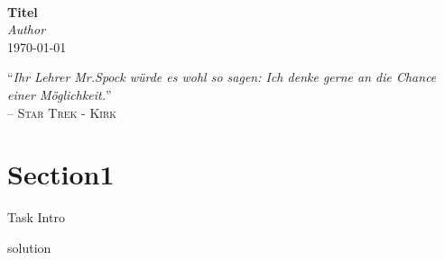 \documentclass[ngerman,a4paper,10pt]{scrartcl}
\newcommand{\DocTitle}      {Titel}
\newcommand{\DocAuthor}     {Author }
\newcommand{\DocDate}       {\today}
\begin{document}
{
    \centering
    ~\\[4cm]
    {\Huge \textbf{ \color{darkblue} \DocTitle } } \\[1cm]
     \color{lightgray} \textit{\DocAuthor} \\ \DocDate \\[1cm]

    {\small
    \begin{flushright}
        "`\textit{Ihr Lehrer Mr.Spock würde es wohl so sagen: Ich denke gerne an die Chance einer Möglichkeit.}"'  \\
        -- \textsc{Star Trek - Kirk}
    \end{flushright}
    }
}
\section{Section1}
Task Intro

\begin{solution}
solution
\end{solution}
\end{document}
